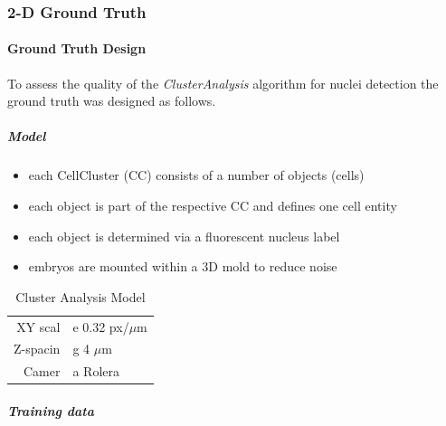 \documentclass[11pt,singlespacinge,twoside]{reedthesis} %
\providecommand{\tightlist}{%
  \setlength{\itemsep}{0pt}\setlength{\parskip}{0pt}}
\begin{document}
\hypertarget{d-ground-truth}{%
\subsubsection{2-D Ground Truth}\label{d-ground-truth}}

\hypertarget{ground-truth-design}{%
\paragraph{Ground Truth Design}\label{ground-truth-design}}

To assess the quality of the \emph{ClusterAnalysis} algorithm for nuclei detection the ground truth was designed as follows.

\hypertarget{model}{%
\subparagraph{Model}\label{model}}
\begin{itemize}
\tightlist
\item
  each CellCluster (CC) consists of a number of objects (cells)
\item
  each object is part of the respective CC and defines one cell entity
\item
  each object is determined via a fluorescent nucleus label
\item
  embryos are mounted within a 3D mold to reduce noise
\end{itemize}
\begin{longtable}[]{@{}rl@{}}
\caption{\label{tab:imgcond3DGrT} Cluster Analysis Model}\tabularnewline
\toprule
\endhead
\begin{minipage}[t]{0.43\columnwidth}\raggedleft
XY scal\strut
\end{minipage} & \begin{minipage}[t]{0.46\columnwidth}\raggedright
e 0.32 px/\(\mu\)m\strut
\end{minipage}\tabularnewline
\begin{minipage}[t]{0.43\columnwidth}\raggedleft
Z-spacin\strut
\end{minipage} & \begin{minipage}[t]{0.46\columnwidth}\raggedright
g 4 \(\mu\)m\strut
\end{minipage}\tabularnewline
\begin{minipage}[t]{0.43\columnwidth}\raggedleft
Camer\strut
\end{minipage} & \begin{minipage}[t]{0.46\columnwidth}\raggedright
a Rolera\strut
\end{minipage}\tabularnewline
\bottomrule
\end{longtable}
\hypertarget{training-data}{%
\subparagraph{Training data}\label{training-data}}
\end{document}
